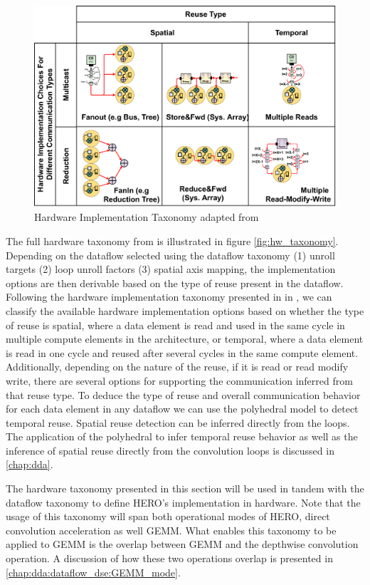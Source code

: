 \begin{figure}[ht]
    \centering
    \includegraphics[scale=0.58]{fig/hw_taxonomy.pdf}
    \caption{Hardware Implementation Taxonomy adapted from \cite{maestro}}
    \label{fig:hw_taxonomy}
\end{figure}


The full hardware taxonomy from \cite{maestro} is illustrated in figure
\autoref{fig:hw_taxonomy}. Depending on the dataflow selected using the dataflow
taxonomy (1) unroll targets (2) loop unroll factors (3)
spatial axis mapping, the
implementation options are then derivable based on the type of reuse present in the
dataflow. Following the hardware implementation taxonomy presented in in
\cite{maestro}, we can classify the available hardware implementation options
based on whether the type of reuse is spatial, where a data element is read and used
in the same cycle in multiple compute elements in the architecture, or temporal, where a data element is read in one cycle and
reused after several cycles in the same compute element. Additionally, depending on the nature of the reuse, if it is read
or read modify write, there are several options for supporting the communication
inferred from that reuse type. To deduce the type of reuse and overall
communication behavior for each data element in any dataflow we can use the
polyhedral model to detect temporal reuse. Spatial reuse detection can be
inferred directly from the loops. The application of the polyhedral to infer
temporal reuse behavior as well as the inference of spatial reuse directly from
the convolution loops is discussed in \autoref{chap:dda}.

The hardware taxonomy presented in this section will
be used in tandem with the dataflow taxonomy to define HERO's implementation in
hardware. Note that the usage of this taxonomy will span both operational modes
of HERO, direct convolution acceleration as well GEMM. What enables this
taxonomy to be applied to GEMM is the overlap between GEMM and the depthwise
convolution operation. A discussion of how these two operations overlap is
presented in \autoref{chap:dda:dataflow_dse:GEMM_mode}. 


